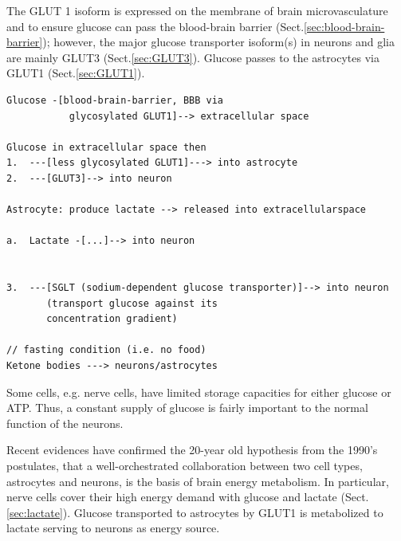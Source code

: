 The GLUT 1 isoform is expressed on the membrane of brain microvasculature and to
ensure glucose can pass the blood-brain barrier
(Sect.\ref{sec:blood-brain-barrier}); however, the major glucose transporter
isoform(s) in neurons and glia are mainly GLUT3 (Sect.\ref{sec:GLUT3}).
Glucose passes to the astrocytes via GLUT1 (Sect.\ref{sec:GLUT1}).


\begin{verbatim}
Glucose -[blood-brain-barrier, BBB via 
           glycosylated GLUT1]--> extracellular space

Glucose in extracellular space then
1.	---[less glycosylated GLUT1]---> into astrocyte 
2.	---[GLUT3]--> into neuron

Astrocyte: produce lactate --> released into extracellularspace

a.	Lactate -[...]--> into neuron


3.	---[SGLT (sodium-dependent glucose transporter)]--> into neuron
       (transport glucose against its 
       concentration gradient)

// fasting condition (i.e. no food)
Ketone bodies ---> neurons/astrocytes
\end{verbatim} 

Some cells, e.g. nerve cells, have limited storage capacities for either glucose
or ATP. Thus, a constant supply of glucose is fairly important to the normal
function of the neurons.  

Recent evidences have confirmed the 20-year old hypothesis from the
1990's postulates, that a well-orchestrated collaboration between two cell
types, astrocytes and neurons, is the basis of brain energy metabolism.
In particular, nerve cells cover their high energy demand with glucose and
lactate (Sect.\ref{sec:lactate}).
Glucose transported to astrocytes by GLUT1 is metabolized to lactate serving to
neurons as energy source.


% 
% 


